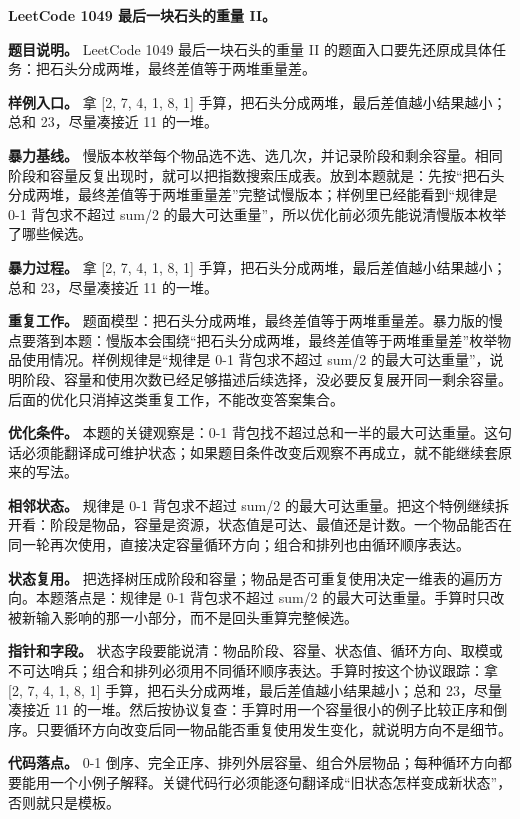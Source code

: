 \noindent\textbf{LeetCode 1049 最后一块石头的重量 II。}

\textbf{题目说明。} LeetCode 1049 最后一块石头的重量 II 的题面入口要先还原成具体任务：把石头分成两堆，最终差值等于两堆重量差。

\textbf{样例入口。} 拿 [2, 7, 4, 1, 8, 1] 手算，把石头分成两堆，最后差值越小结果越小；总和 23，尽量凑接近 11 的一堆。

\textbf{暴力基线。} 慢版本枚举每个物品选不选、选几次，并记录阶段和剩余容量。相同阶段和容量反复出现时，就可以把指数搜索压成表。放到本题就是：先按“把石头分成两堆，最终差值等于两堆重量差”完整试慢版本；样例里已经能看到“规律是 0-1 背包求不超过 sum/2 的最大可达重量”，所以优化前必须先能说清慢版本枚举了哪些候选。

\textbf{暴力过程。} 拿 [2, 7, 4, 1, 8, 1] 手算，把石头分成两堆，最后差值越小结果越小；总和 23，尽量凑接近 11 的一堆。

\textbf{重复工作。} 题面模型：把石头分成两堆，最终差值等于两堆重量差。暴力版的慢点要落到本题：慢版本会围绕“把石头分成两堆，最终差值等于两堆重量差”枚举物品使用情况。样例规律是“规律是 0-1 背包求不超过 sum/2 的最大可达重量”，说明阶段、容量和使用次数已经足够描述后续选择，没必要反复展开同一剩余容量。后面的优化只消掉这类重复工作，不能改变答案集合。

\textbf{优化条件。} 本题的关键观察是：0-1 背包找不超过总和一半的最大可达重量。这句话必须能翻译成可维护状态；如果题目条件改变后观察不再成立，就不能继续套原来的写法。

\textbf{相邻状态。} 规律是 0-1 背包求不超过 sum/2 的最大可达重量。把这个特例继续拆开看：阶段是物品，容量是资源，状态值是可达、最值还是计数。一个物品能否在同一轮再次使用，直接决定容量循环方向；组合和排列也由循环顺序表达。

\textbf{状态复用。} 把选择树压成阶段和容量；物品是否可重复使用决定一维表的遍历方向。本题落点是：规律是 0-1 背包求不超过 sum/2 的最大可达重量。手算时只改被新输入影响的那一小部分，而不是回头重算完整候选。

\textbf{指针和字段。} 状态字段要能说清：物品阶段、容量、状态值、循环方向、取模或不可达哨兵；组合和排列必须用不同循环顺序表达。手算时按这个协议跟踪：拿 [2, 7, 4, 1, 8, 1] 手算，把石头分成两堆，最后差值越小结果越小；总和 23，尽量凑接近 11 的一堆。然后按协议复查：手算时用一个容量很小的例子比较正序和倒序。只要循环方向改变后同一物品能否重复使用发生变化，就说明方向不是细节。

\textbf{代码落点。} 0-1 倒序、完全正序、排列外层容量、组合外层物品；每种循环方向都要能用一个小例子解释。关键代码行必须能逐句翻译成“旧状态怎样变成新状态”，否则就只是模板。

